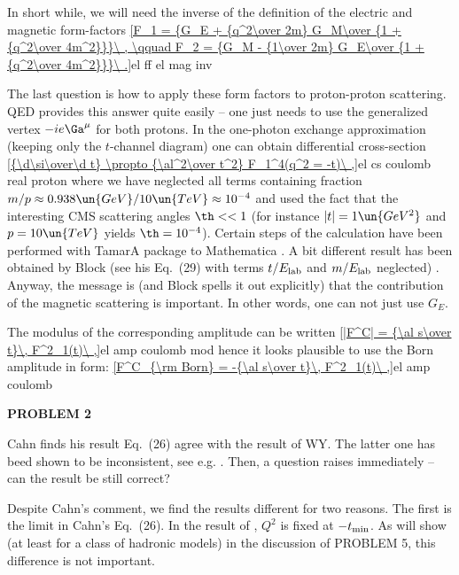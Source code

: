 In short while, we will need the inverse of the definition of the electric and magnetic form-factors
\eqref{F_1 = {G_E + {q^2\over 2m} G_M\over {1 + {q^2\over 4m^2}}}\ , \qquad F_2 = {G_M - {1\over 2m} G_E\over {1 + {q^2\over 4m^2}}}\ .}{el ff el mag inv}

The last question is how to apply these form factors to proton-proton scattering. QED provides this answer quite easily -- one just needs to use the generalized vertex $-ie\Ga^\mu$ for both protons. In the one-photon exchange approximation (keeping only the $t$-channel diagram) one can obtain differential cross-section
\eqref{{\d\si\over\d t} \propto {\al^2\over t^2} F_1^4(q^2 = -t)\ ,}{el cs coulomb real proton}
where we have neglected all terms containing fraction $m/p\approx 0.938\un{GeV}/10\un{TeV}\approx 10^{-4}$ and used the fact that the interesting CMS scattering angles $\th<<1$ (for instance $|t|=1\un{GeV^2}$ and $p=10\un{TeV}$ yields $\th=10^{-4}$). Certain steps of the calculation have been performed with TamarA package  to Mathematica . A bit different result has been obtained by Block  (see his Eq.~(29) with terms $t/E_{\rm lab}$ and $m/E_{\rm lab}$ neglected) . Anyway, the message is (and Block spells it out explicitly) that the contribution of the magnetic scattering is important. In other words, one can not just use $G_E$.


The modulus of the corresponding amplitude can be written
\eqref{|F^C| = {\al s\over t}\, F^2_1(t)\ ,}{el amp coulomb mod}
hence it looks plausible to use the Born amplitude in form:
\eqref{F^C_{\rm Born} = -{\al s\over t}\, F^2_1(t)\ ,}{el amp coulomb}

{\bf PROBLEM 2}

Cahn finds his result Eq.~(26) agree with the result of WY. The latter one has beed shown to be inconsistent, see e.g. . Then, a question raises immediately -- can the result be still correct?

Despite Cahn's comment, we find the results different for two reasons. The first is the limit in Cahn's Eq.~(26). In the result of \WaY{}, $Q^2$ is fixed at $-t_{\rm min}$. As will show (at least for a class of hadronic models) in the discussion of PROBLEM 5, this difference is not important.

